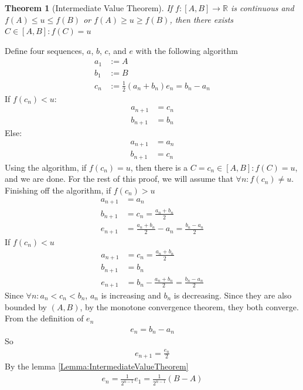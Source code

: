 \documentclass{amsart}
\numberwithin{equation}{section}
\let\oldendproof\endproof
\renewenvironment{proof}[1][\proofname]{%
  \setcounter{case}{0}
  \setcounter{step}{0}
  \oldproof[#1]%
}{\oldendproof}
\theoremstyle{plain}
\newtheorem{theorem}{Theorem}[section]
\theoremstyle{definition}
\theoremstyle{remark}
\begin{document}
\begin{theorem}[Intermediate Value Theorem]
  If $f:[A,B] \to \mathbb{R}$ is continuous and $f(A)\leq u \leq f(B)$ or $f(A)\geq u \geq f(B)$, then there exists $C\in[A,B]: f(C)= u$
\end{theorem}
\begin{proof}
  Define four sequences, $a$, $b$, $c$, and $e$ with the following algorithm
  \begin{align}
    a_1&:=A\\
    b_1&:=B\\
    c_n &:= \frac{1}{2} (a_n + b_n)
    e_n = b_n - a_n
  \end{align}
  If $f(c_n) < u$:
  \begin{align}
    a_{n+1} &= c_n\\
    b_{n+1} &= b_n
  \end{align}
  Else:
  \begin{align}
    a_{n+1} &= a_n\\
    b_{n+1} &= c_n
  \end{align}
  Using the algorithm, if $f(c_n) = u$, then there  is a $C=c_n\in[A,B]: f(C) = u$, and we are done.
  For the rest of this proof, we will assume that $\forall n: f(c_n) \neq u$.
  Finishing off the algorithm, if $f(c_n) > u$
  \begin{align}
    a_{n+1} &= a_n\\
    b_{n+1} &= c_n = \frac{a_n+b_n}{2}\\
    e_{n+1} &= \frac{a_n+b_n}{2} - a_n= \frac{b_n- a_n}{2}
  \end{align}
  If $f(c_n) < u$
  \begin{align}
    a_{n+1} &= c_n = \frac{a_n+b_n}{2} \\
    b_{n+1} &= b_n\\
    e_{n+1} &= b_n - \frac{a_n + b_n}{2} = \frac{b_n - a_n}{2}
  \end{align}
  Since $\forall n:a_n<c_n<b_n$, $a_n$ is increasing and $b_n$ is decreasing. Since they are also bounded by $(A,B)$, by the monotone convergence theorem, they both converge.
  From the definition of $e_n$
  \begin{align}
    e_n = b_n- a_n
  \end{align}
  So
  \begin{align}
    e_{n+1} = \frac{e_n}{2}
  \end{align}
  By the lemma \ref{Lemma:IntermediateValueTheorem}
  \begin{align}
    e_n = \frac{1}{2^{n-1}} e_1 = \frac{1}{2^{n-1}} \left(B-A\right)		

\end{align}
\end{proof}
\end{document}
